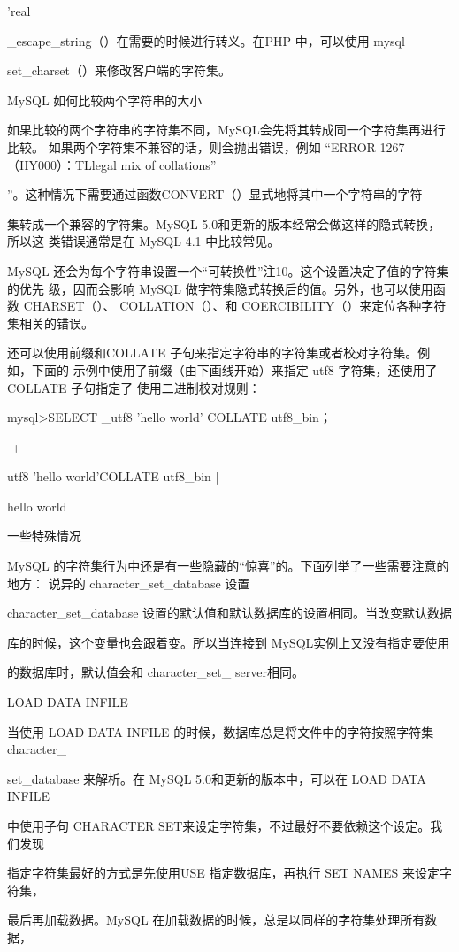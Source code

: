 'real

\_escape\_string（）在需要的时候进行转义。在PHP 中，可以使用 mysql

set\_charset（）来修改客户端的字符集。

MySQL 如何比较两个字符串的大小

如果比较的两个字符串的字符集不同，MySQL会先将其转成同一个字符集再进行比较。
如果两个字符集不兼容的话，则会抛出错误，例如 “ERROR 1267（HY000）：TLlegal mix
of collations”

”。这种情况下需要通过函数CONVERT（）显式地将其中一个字符串的字符

集转成一个兼容的字符集。MySQL 5.0和更新的版本经常会做这样的隐式转换，所以这
类错误通常是在 MySQL 4.1 中比较常见。

MySQL 还会为每个字符串设置一个“可转换性”注10。这个设置决定了值的字符集的优先
级，因而会影响 MySQL 做字符集隐式转换后的值。另外，也可以使用函数 CHARSET（）、
COLLATION（）、和 COERCIBILITY（）来定位各种字符集相关的错误。

还可以使用前缀和COLLATE 子句来指定字符串的字符集或者校对字符集。例如，下面的
示例中使用了前缀（由下画线开始）来指定 utf8 字符集，还使用了COLLATE 子句指定了
使用二进制校对规则：

mysql>SELECT \_utf8 'hello world' COLLATE utf8\_bin；

-+

utf8 'hello world'COLLATE utf8\_bin |

hello world

一些特殊情况

MySQL 的字符集行为中还是有一些隐藏的“惊喜”的。下面列举了一些需要注意的地方：
说异的 character\_set\_database 设置

character\_set\_database 设置的默认值和默认数据库的设置相同。当改变默认数据

库的时候，这个变量也会跟着变。所以当连接到 MySQL实例上又没有指定要使用

的数据库时，默认值会和 character\_set\_ server相同。

LOAD DATA INFILE

当使用 LOAD DATA INFILE 的时候，数据库总是将文件中的字符按照字符集 character\_

set\_database 来解析。在 MySQL 5.0和更新的版本中，可以在 LOAD DATA INFILE

中使用子句 CHARACTER SET来设定字符集，不过最好不要依赖这个设定。我们发现

指定字符集最好的方式是先使用USE 指定数据库，再执行 SET NAMES 来设定字符集，

最后再加载数据。MySQL 在加载数据的时候，总是以同样的字符集处理所有数据，


